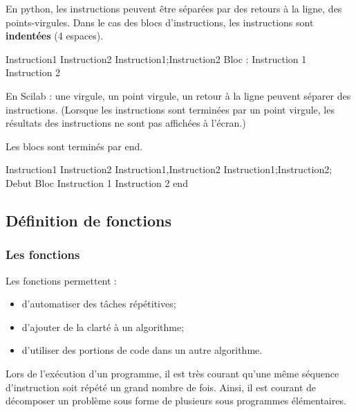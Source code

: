 \documentclass[10pt,fleqn]{article} %
\begin{document}
\begin{minipage}[c]{.47\linewidth}
En python, les instructions peuvent être séparées par des retours à la ligne, des points-virgules. Dans le cas des blocs d'instructions, les instructions sont \textbf{indentées} (4 espaces). 

\end{minipage}\hfill
\begin{minipage}[c]{.47\linewidth}
\begin{py}
\begin{minipage}{.9\linewidth}
\begin{python}[showspaces=true]
Instruction1
Instruction2
Instruction1;Instruction2
Bloc : 
    Instruction 1
    Instruction 2
\end{python}
\end{minipage}
\end{py}
\end{minipage}


\begin{minipage}[c]{.47\linewidth}
En Scilab : une virgule, un point virgule, un retour à la ligne peuvent séparer des instructions. (Lorsque les instructions sont terminées par un point virgule, les résultats des instructions ne sont pas affichées à l'écran.)

Les blocs sont terminés par \textsf{end}.
\end{minipage}\hfill
\begin{minipage}[c]{.47\linewidth}
\begin{sci}
\begin{scilab}
Instruction1
Instruction2
Instruction1,Instruction2
Instruction1;Instruction2;
Debut Bloc
Instruction 1
Instruction 2
end
\end{scilab}
\end{sci}
\end{minipage}




\subsection{Définition de fonctions}
\subsubsection{Les fonctions}
\begin{defi}

Les fonctions permettent :
\begin{itemize}
\item d’automatiser des tâches répétitives;
\item d’ajouter de la clarté à un algorithme;
\item d’utiliser des portions de code dans un autre algorithme.
\end{itemize}
\end{defi}
Lors de l'exécution d'un programme, il est très courant qu'une même séquence d'instruction soit répété un grand nombre de fois. Ainsi, il est courant de décomposer un problème sous forme de plusieurs sous programmes élémentaires. 
\end{document}
